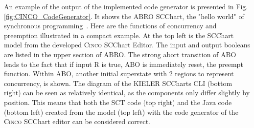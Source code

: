 An example of the output of the implemented code generator is presented in Fig. \ref{fig:CINCO_CodeGenerator}. It shows the ABRO SCChart, the "hello world" of synchronous programming~\cite{Hanxleden.2014}. Here are the functions of concurrency and preemption illustrated in a compact example. At the top left is the SCChart model from the developed \textsc{Cinco} SCChart Editor. The input and output booleans are listed in the upper section of ABRO. The strong abort transition of ABO leads to the fact that if input R is true, ABO is immediately reset, the preempt function. Within ABO, another initial superstate with 2 regions to represent concurrency, is shown. The diagram of the KIELER SCCharts CLI (bottom right) can be seen as relatively identical, as the components only differ slightly by position. This means that both the SCT code (top right) and the Java code (bottom left) created from the model (top left) with the code generator of the \textsc{Cinco} SCChart editor can be considered correct. 

